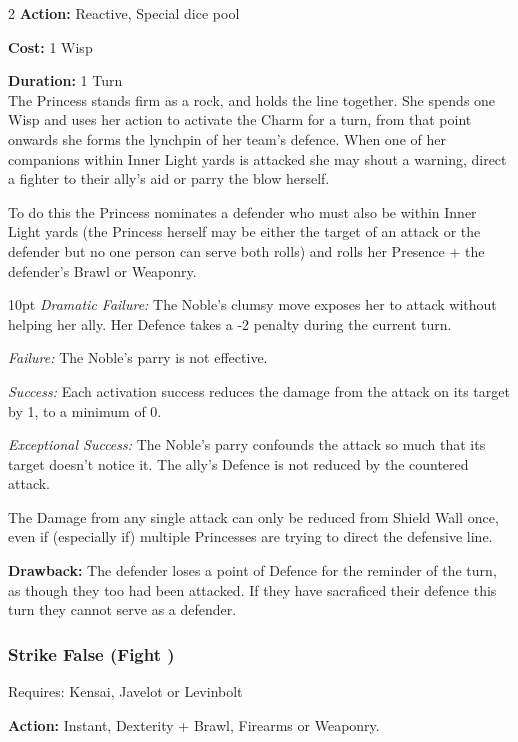 \begin{multicols}{2}
\noindent \textbf{Action:} Reactive, Special dice pool

\noindent \textbf{Cost:} 1 Wisp

\noindent \textbf{Duration:} 1 Turn\\

\noindent The Princess stands firm as a rock, and holds the line together. She spends one Wisp and uses her action to activate the Charm for a turn, from that point onwards she forms the lynchpin of her team's defence. When one of her companions within Inner Light yards is attacked she may shout a warning, direct a fighter to their ally's aid or parry the blow herself. 

To do this the Princess nominates a defender who must also be within Inner Light yards (the Princess herself may be either the target of an attack or the defender but no one person can serve both rolls) and rolls her Presence + the defender's Brawl or Weaponry. 

\begin{myindentpar}{10pt} 
\emph{Dramatic Failure:}  The Noble’s clumsy move exposes her to attack without helping her ally. Her Defence takes a -2 penalty during the current turn.

\emph{Failure:} The Noble’s parry is not effective.

\emph{Success:} Each activation success reduces the damage from the attack on its target by 1, to a minimum of 0.

\emph{Exceptional Success:} The Noble’s parry confounds the attack so much that its target doesn’t notice it. The ally’s Defence is not reduced by the countered attack.\end{myindentpar}

The Damage from any single attack can only be reduced from Shield Wall once, even if (especially if) multiple Princesses are trying to direct the defensive line.

\noindent \textbf{Drawback:} The defender loses a point of Defence for the reminder of the turn, as though they too had been attacked. If they have sacraficed their defence this turn they cannot serve as a defender. 

\subsubsection*{Strike False (Fight \textbullet\textbullet)}

\noindent Requires: Kensai, Javelot or Levinbolt

\noindent \textbf{Action:} Instant, Dexterity + Brawl, Firearms or Weaponry.


\end{multicols}
